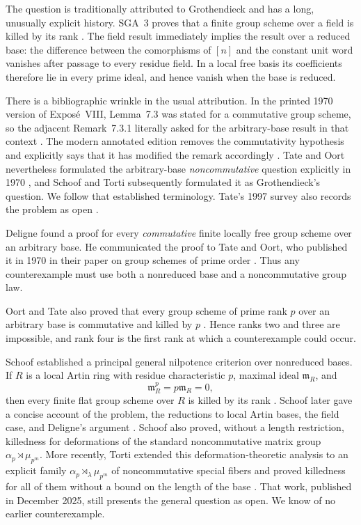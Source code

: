 \documentclass[11pt]{amsart}
\theoremstyle{remark}
\newcommand{\m}{\mathfrak m}
\begin{document}
The question is traditionally attributed to Grothendieck and has a long,
unusually explicit history.  SGA~3 proves that a finite group scheme over
a field is killed by its rank
\cite[Exp.~VIIA, Prop.~8.5]{SGA3I}.  The field result immediately
implies the result over a reduced base: the difference between the
comorphisms of \([n]\) and the constant unit word vanishes after passage
to every residue field.  In a local free basis its coefficients
therefore lie in every prime ideal, and hence vanish when the base is
reduced.

There is a bibliographic wrinkle in the usual attribution.  In the
printed 1970 version of Expos\'e~VIII, Lemma~7.3 was stated for a
commutative group scheme, so the adjacent Remark~7.3.1 literally asked
for the arbitrary-base result in that context
\cite[Exp.~VIII, Lem.~7.3 and Rem.~7.3.1]{SGA3II}.  The modern
annotated edition removes the commutativity hypothesis and explicitly says that it
has modified the remark accordingly
\cite[notes (38)--(39)]{SGA3VIIIannotated}.  Tate and Oort nevertheless
formulated the arbitrary-base \emph{noncommutative} question explicitly
in 1970 \cite[p.~5]{OortTate}, and Schoof and Torti subsequently
formulated it as Grothendieck's question.  We follow that established
terminology.  Tate's 1997 survey also records the problem as open
\cite[\S3.8]{Tate1997}.

Deligne found a proof for every \emph{commutative} finite locally free
group scheme over an arbitrary base.  He communicated the proof to Tate
and Oort, who published it in 1970 in their paper on group schemes of
prime order \cite[\S1]{OortTate}.  Thus any counterexample must use both a
nonreduced base and a noncommutative group law.

Oort and Tate also proved that every group scheme of prime rank \(p\)
over an arbitrary base is commutative and killed by \(p\)
\cite[Thm.~1]{OortTate}.  Hence ranks two and three are impossible, and
rank four is the first rank at which a counterexample could occur.

Schoof established a principal general nilpotence criterion over
nonreduced bases.  If \(R\) is a local Artin ring with residue
characteristic \(p\), maximal ideal \(\m_R\), and
\[
 \m_R^p=p\m_R=0,
\]
then every finite flat group scheme over \(R\) is killed by its rank
\cite{Schoof2001}.  Schoof later gave a concise account of the problem,
the reductions to local Artin bases, the field case, and Deligne's
argument \cite{SchoofSurvey}.  Schoof also proved, without a length
restriction, killedness for deformations of the standard noncommutative
matrix group \(\alpha_p\rtimes\mu_{p^m}\).  More recently, Torti
extended this deformation-theoretic analysis to an explicit family
\(\alpha_p\rtimes_\lambda\mu_{p^m}\) of noncommutative special fibers and
proved killedness for all of them without a bound on the length of the
base \cite[Thms.~1.3--1.4]{Torti}.  That work, published in December
2025, still presents the general question as open.  We know of no earlier
counterexample.
\end{document}
